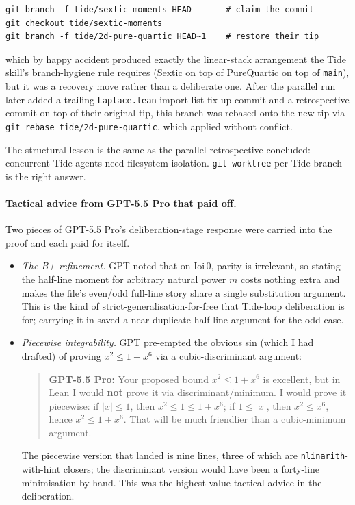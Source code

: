 \documentclass[11pt]{article}
\newcommand{\gptbox}[1]{\par\medskip\begin{quote}\small\textbf{\textcolor{green!50!black}{GPT-5.5 Pro:}} #1\end{quote}\medskip}
\begin{document}
\begin{verbatim}
git branch -f tide/sextic-moments HEAD       # claim the commit
git checkout tide/sextic-moments
git branch -f tide/2d-pure-quartic HEAD~1    # restore their tip
\end{verbatim}

\noindent which by happy accident produced exactly the linear-stack
arrangement the Tide skill's branch-hygiene rule requires (Sextic on top of
PureQuartic on top of \texttt{main}), but it was a recovery move rather than
a deliberate one. After the parallel run later added a trailing
\texttt{Laplace.lean} import-list fix-up commit and a retrospective commit
on top of their original tip, this branch was rebased onto the new tip via
\texttt{git rebase tide/2d-pure-quartic}, which applied without conflict.

The structural lesson is the same as the parallel retrospective concluded:
concurrent Tide agents need filesystem isolation. \texttt{git worktree} per
Tide branch is the right answer.

\paragraph{Tactical advice from GPT-5.5 Pro that paid off.} Two pieces of
GPT-5.5 Pro's deliberation-stage response were carried into the proof and
each paid for itself.

\begin{itemize}\itemsep0pt

\item \emph{The B+ refinement.} GPT noted that on $\mathrm{Ioi}\,0$, parity is
irrelevant, so stating the half-line moment for arbitrary natural power $m$
costs nothing extra and makes the file's even/odd full-line story share a
single substitution argument. This is the kind of strict-generalisation-for-free
that Tide-loop deliberation is for; carrying it in saved a near-duplicate
half-line argument for the odd case.

\item \emph{Piecewise integrability.} GPT pre-empted the obvious sin (which
I had drafted) of proving $x^2 \leq 1 + x^6$ via a cubic-discriminant
argument:

\gptbox{Your proposed bound $x^2 \leq 1 + x^6$ is excellent, but in Lean I
would \textbf{not} prove it via discriminant/minimum. I would prove it
piecewise: if $|x| \leq 1$, then $x^2 \leq 1 \leq 1 + x^6$; if
$1 \leq |x|$, then $x^2 \leq x^6$, hence $x^2 \leq 1 + x^6$. That will be
much friendlier than a cubic-minimum argument.}

\noindent The piecewise version that landed is nine lines, three of which
are \texttt{nlinarith}-with-hint closers; the discriminant version would
have been a forty-line minimisation by hand. This was the highest-value
tactical advice in the deliberation.
\end{itemize}
\end{document}
